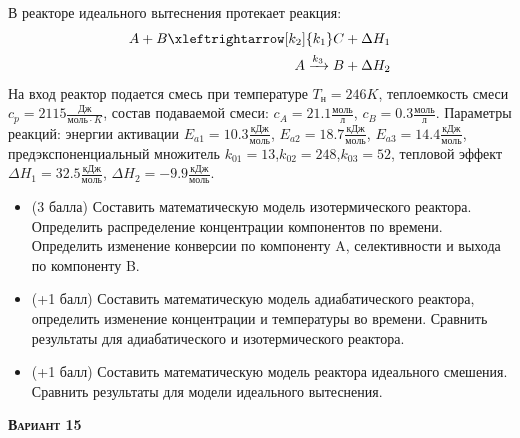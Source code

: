  В реакторе идеального вытеснения протекает реакция: \begin{equation*} \begin{aligned} A+B \xleftrightarrow[k_2]{k_1} C +\Delta H_1 \\ A \xrightarrow{k_3} B + \Delta H_2 \end{aligned} \end{equation*}                                     На вход  реактор подается смесь при температуре $ T_н =  246 K$, теплоемкость смеси $c_p= 2115 \frac{Дж}{моль \cdot K}$, состав подаваемой смеси: $c_A=21.1 \frac{моль}{л}$, $c_B=0.3 \frac{моль}{л}$. Параметры реакций: энергии активации $E_{a1}=10.3 \frac{кДж}{моль}$, $E_{a2}=18.7  \frac{кДж}{моль}$, $E_{a3}=14.4  \frac{кДж}{моль}$, предэкспоненциальный множитель $k_{01}=        13$,$k_{02}=       248$,$k_{03}=        52$, тепловой эффект $\Delta H_1= 32.5  \frac{кДж}{моль}$, $\Delta H_2=-9.9 \frac{кДж}{моль}$.\begin{itemize} \item (3 балла) Составить математическую модель изотермического реактора. Определить распределение концентрации компонентов по времени. Определить изменение конверсии по компоненту A, селективности и выхода по компоненту B. \item (+1 балл) Составить математическую модель адиабатического реактора, определить изменение концентрации и температуры во времени. Сравнить результаты для адиабатического и изотермического реактора. \item (+1 балл) Составить математическую модель реактора идеального смешения. Сравнить результаты для модели идеального вытеснения. \end{itemize}

\textsc{\textbf{Вариант 15}}

